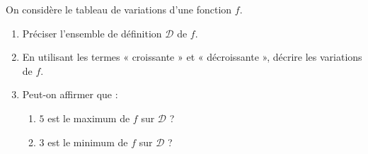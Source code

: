 \begin{exo}{}
	On considère le tableau de variations d'une fonction $f$.

	\vspace*{2mm}
	\begin{center}
	\end{center}

	\begin{enumerate}
		\item Préciser l'ensemble de définition $\mathcal{D}$ de $f$.
		\item En utilisant les termes « croissante » et « décroissante », décrire les variations de $f$.
		\item Peut-on affirmer que :
		      \begin{enumerate}
			      \item $5$ est le maximum de $f$ sur $\mathcal{D}$ ?
			      \item $3$ est le minimum de $f$ sur $\mathcal{D}$ ?
		      \end{enumerate}
	\end{enumerate}
\end{exo}
